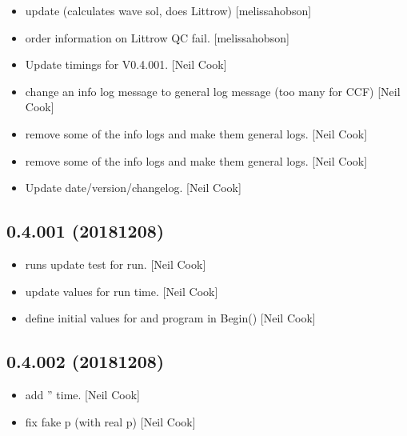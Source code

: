 \documentclass[a4paper,10pt,english]{report}
\begin{document}
\begin{itemize}
\item {} 
 update (calculates wave sol, does Littrow)
{[}melissa\sphinxhyphen{}hobson{]}

\item {} 
 order information on Littrow QC fail. {[}melissa\sphinxhyphen{}hobson{]}

\item {} 
Update timings for V0.4.001. {[}Neil Cook{]}

\item {} 
 \sphinxhyphen{} change an info log message to general log message (too
many for CCF) {[}Neil Cook{]}

\item {} 
 \sphinxhyphen{} remove some of the info logs and make them general
logs. {[}Neil Cook{]}

\item {} 
 \sphinxhyphen{} remove some of the info logs and make them general
logs. {[}Neil Cook{]}

\item {} 
Update date/version/changelog. {[}Neil Cook{]}

\end{itemize}


\subsection{0.4.001 (2018\sphinxhyphen{}12\sphinxhyphen{}08)}
\label{\detokenize{misc/changelog:id263}}\begin{itemize}
\item {} 
 runs \sphinxhyphen{} update test for run. {[}Neil Cook{]}

\item {} 
 \sphinxhyphen{} update values for run time. {[}Neil Cook{]}

\item {} 
 \sphinxhyphen{} define initial values for  and program in
Begin() {[}Neil Cook{]}

\end{itemize}


\subsection{0.4.002 (2018\sphinxhyphen{}12\sphinxhyphen{}08)}
\label{\detokenize{misc/changelog:id264}}\begin{itemize}
\item {} 
 \sphinxhyphen{} add ” time. {[}Neil Cook{]}

\item {} 
 \sphinxhyphen{} fix fake p (with real p) {[}Neil Cook{]}

\end{itemize}
\end{document}
